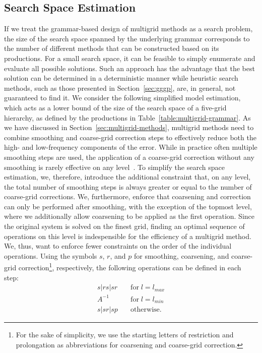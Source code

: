 \subsection{Search Space Estimation}
\label{sec:search-space-estimation}
If we treat the grammar-based design of multigrid methods as a search problem, the size of the search space spanned by the underlying grammar corresponds to the number of different methods that can be constructed based on its productions.
For a small search space, it can be feasible to simply enumerate and evaluate all possible solutions. 
Such an approach has the advantage that the best solution can be determined in a deterministic manner while heuristic search methods, such as those presented in Section~\ref{sec:gggp}, are, in general, not guaranteed to find it.
We consider the following simplified model estimation, which acts as a lower bound of the size of the search space of a five-grid hierarchy, as defined by the productions in Table~\ref{table:multigrid-grammar}. 
As we have discussed in Section~\ref{sec:multigrid-methods}, multigrid methods need to combine smoothing and coarse-grid correction steps to effectively reduce both the high- and low-frequency components of the error.
While in practice often multiple smoothing steps are used, the application of a coarse-grid correction without any smoothing is rarely effective on any level~\cite{trottenberg2000multigrid}.
To simplify the search space estimation, we, therefore, introduce the additional constraint that, on any level, the total number of smoothing steps is always greater or equal to the number of coarse-grid corrections.
We, furthermore, enforce that coarsening and correction can only be performed after smoothing, with the exception of the topmost level, where we additionally allow coarsening to be applied as the first operation.
Since the original system is solved on the finest grid, finding an optimal sequence of operations on this level is indespensible for the efficiency of a multigrid method.
We, thus, want to enforce fewer constraints on the order of the individual operations.
Using the symbols $s$, $r$, and $p$ for smoothing, coarsening, and coarse-grid correction\footnote{For the sake of simplicity, we use the starting letters of restriction and prolongation as abbreviations for coarsening and coarse-grid correction.}, respectively, the following operations can be defined in each step:
\begin{equation}\tag{4.8}
\begin{split}
	s | rs | sr & \quad \text{for} \; l = l_{max} \\
	A^{-1} & \quad \text{for} \; l = l_{min} \\
	s | sr | sp & \quad \text{otherwise}.
\end{split}
\end{equation}
